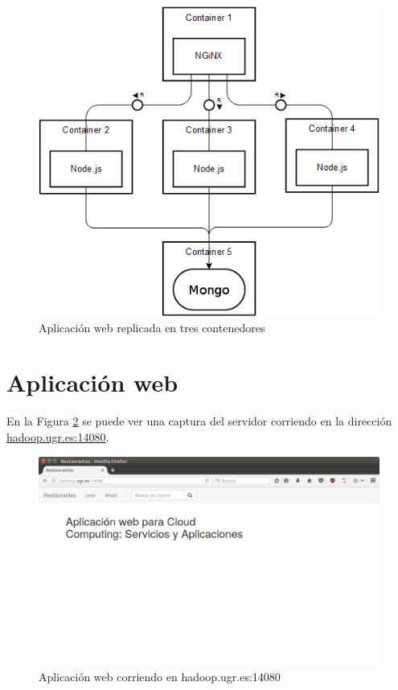 \begin{figure}[h!]
	\centering
	\includegraphics[width=13cm]{./images/balanced}
	\caption{Aplicación web replicada en tres contenedores} 
	\label{fig:balanced}
\end{figure}

\section{Aplicación web}

En la Figura \ref{fig:app} se puede ver una captura del servidor corriendo en la dirección \href{hadoop.ugr.es:14080}{hadoop.ugr.es:14080}. \\

\begin{figure}[h!]
	\centering
	\includegraphics[width=13cm]{./images/running}
	\caption{Aplicación web corriendo en hadoop.ugr.es:14080} 
	\label{fig:app}
\end{figure}

